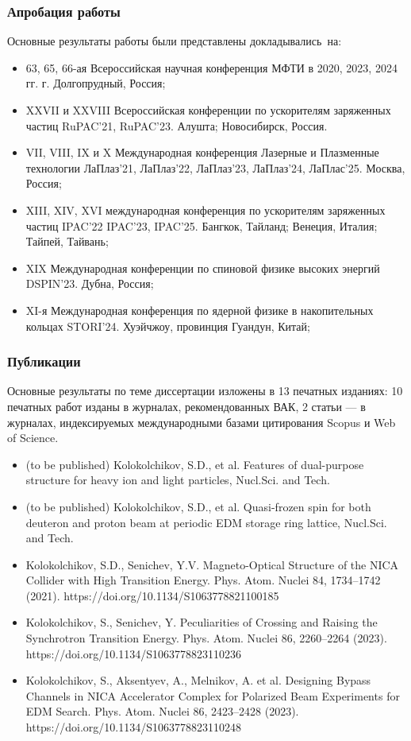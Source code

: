 \begin{frame}
	\frametitle{Апробация работы}
	Основные результаты работы были представлены докладывались~на:
	\small
	\begin{itemize}
		\item 63, 65, 66-ая Всероссийская научная конференция МФТИ в 2020, 2023, 2024 гг. г. Долгопрудный,
		Россия;
		\item XXVII и XXVIII Всероссийская конференции по ускорителям заряженных частиц RuPAC'21, RuPAC'23. Алушта; Новосибирск, Россия.
		\item VII, VIII, IX и X Международная конференция Лазерные и Плазменные технологии ЛаПлаз'21, ЛаПлаз'22, ЛаПлаз'23, ЛаПлаз'24, ЛаПлас'25. Москва, Россия;
		\item XIII, XIV, XVI международная конференция по ускорителям заряженных частиц IPAC'22 IPAC'23, IPAC'25. Бангкок, Тайланд; Венеция, Италия; Тайпей, Тайвань;
		\item XIX Международная конференции по спиновой физике высоких энергий DSPIN'23. Дубна, Россия;
		\item XI-я Международная конференция по ядерной физике в накопительных кольцах STORI’24. Хуэйчжоу, провинция Гуандун, Китай;
	\end{itemize}
\end{frame}
\begin{frame}
	\frametitle{Публикации}
	Основные результаты по теме диссертации изложены в 13 печатных
	изданиях: 10 печатных работ изданы в журналах, рекомендованных
	ВАК, 2 статьи — в журналах, индексируемых международными
	базами цитирования Scopus и Web of Science.
	\small
	\begin{itemize}
		\item	(to be published) Kolokolchikov, S.D., et al. Features of dual-purpose structure for heavy ion and light particles, Nucl.Sci. and Tech.
		\item (to be published) Kolokolchikov, S.D., et al. Quasi-frozen spin for both deuteron and proton beam at periodic EDM storage ring lattice, Nucl.Sci. and Tech.
		\item	Kolokolchikov, S.D., Senichev, Y.V. Magneto-Optical Structure of the NICA Collider with High Transition Energy. Phys. Atom. Nuclei 84, 1734–1742 (2021). https://doi.org/10.1134/S1063778821100185
		\item	Kolokolchikov, S., Senichev, Y. Peculiarities of Crossing and Raising the Synchrotron Transition Energy. Phys. Atom. Nuclei 86, 2260–2264 (2023). https://doi.org/10.1134/S1063778823110236
		\item	Kolokolchikov, S., Aksentyev, A., Melnikov, A. et al. Designing Bypass Channels in NICA Accelerator Complex for Polarized Beam Experiments for EDM Search. Phys. Atom. Nuclei 86, 2423–2428 (2023). https://doi.org/10.1134/S1063778823110248
		
	\end{itemize}
\end{frame}

